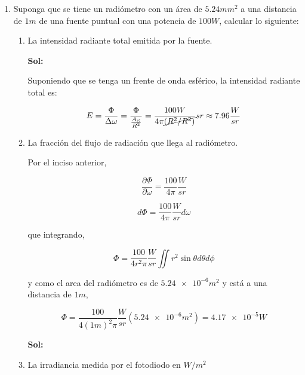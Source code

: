 \documentclass[12pt,a4paper]{article}
\begin{document}
\begin{enumerate}



\item Suponga que se tiene un radiómetro con un área de $5.24 mm^2$ a una distancia de $1m$ de una fuente puntual con una potencia de $100W$, calcular lo siguiente:

\begin{enumerate}
    \item La intensidad radiante total emitida por la fuente.
    
    \textbf{Sol:}
    
    Suponiendo que se tenga un frente de onda esférico, la intensidad radiante total es:
    
    \begin{equation*}
        E = \frac{\Phi}{\Delta \omega} =\frac{\Phi}{\frac{A_S}{R^2}}= \frac{100 W}{4 \pi \cancel{(R^2/R^2)}} sr \approx 7.96 \frac{W}{sr}
    \end{equation*}
    
    \item La fracción del flujo de radiación que llega al radiómetro.
    
    Por el inciso anterior,
    
    \begin{equation*}
        \frac{\partial  \Phi}{\partial \omega} = \frac{100}{4 \pi} \frac{W}{sr}
    \end{equation*}
    
    \begin{equation*}
        d\Phi = \frac{100}{4 \pi} \frac{W}{sr} d\omega
    \end{equation*}
    
    que integrando,
    
    \begin{equation*}
        \Phi = \frac{100}{4 r^2 \pi} \frac{W}{sr} \iint  r^2\sin{\theta} d\theta d\phi
    \end{equation*}
    
    y como el area del radiómetro es de $\num{5.24e-6} m^2$ y está a una distancia de $1m$,
    
    \begin{equation*}
        \Phi = \frac{100}{4 (1m)^2 \pi} \frac{W}{sr} (\num{5.24e-6} m^2) = \num{4.17e-5} W 
    \end{equation*}
    
    \textbf{Sol:}
    
    \item La irradiancia medida por el fotodiodo en $W/m^2$
    

\end{enumerate}
\end{enumerate}
\end{document}
